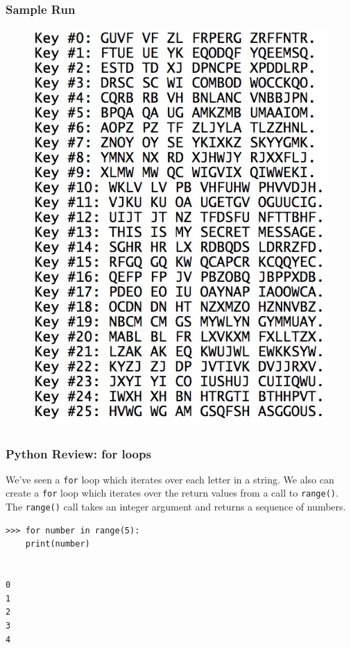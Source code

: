 \documentclass{beamer}
\newcommand{\<}{\langle}
\renewcommand{\>}{\rangle}
\begin{document}
\begin{frame}[fragile]
\frametitle{Sample Run}

\begin{figure}
\includegraphics[scale=.3]{IMG/sample.jpg}
\end{figure}
\end{frame}

\begin{frame}[fragile]
\frametitle{Python Review: for loops}

We've seen a \verb|for| loop which iterates over each letter in a string. We also can create a \verb|for| loop which iterates over the return values from a call to \verb|range()|. The \verb|range()| call takes an integer argument and returns a sequence of numbers.
\begin{verbatim}
>>> for number in range(5):
	print(number)

	
0
1
2
3
4
\end{verbatim}
\end{frame}
\end{document}
